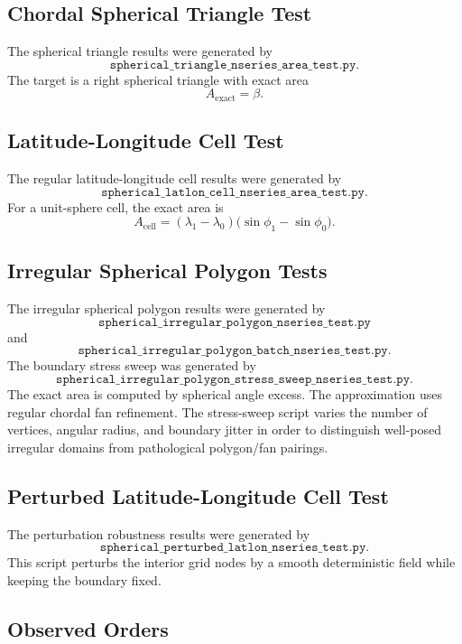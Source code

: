 \documentclass[11pt]{article}
\begin{document}
\subsection{Chordal Spherical Triangle Test}

The spherical triangle results were generated by
\[
  \texttt{spherical\_triangle\_nseries\_area\_test.py}.
\]
The target is a right spherical triangle with exact area
\[
  A_{\mathrm{exact}}=\beta.
\]

\subsection{Latitude-Longitude Cell Test}

The regular latitude-longitude cell results were generated by
\[
  \texttt{spherical\_latlon\_cell\_nseries\_area\_test.py}.
\]
For a unit-sphere cell, the exact area is
\[
  A_{\mathrm{cell}}
  =
  (\lambda_1-\lambda_0)
  \bigl(\sin\phi_1-\sin\phi_0\bigr).
\]

\subsection{Irregular Spherical Polygon Tests}

The irregular spherical polygon results were generated by
\[
  \texttt{spherical\_irregular\_polygon\_nseries\_test.py}
\]
and
\[
  \texttt{spherical\_irregular\_polygon\_batch\_nseries\_test.py}.
\]
The boundary stress sweep was generated by
\[
  \texttt{spherical\_irregular\_polygon\_stress\_sweep\_nseries\_test.py}.
\]
The exact area is computed by spherical angle excess.  The approximation uses regular chordal fan refinement.  The stress-sweep script varies the number of vertices, angular radius, and boundary jitter in order to distinguish well-posed irregular domains from pathological polygon/fan pairings.

\subsection{Perturbed Latitude-Longitude Cell Test}

The perturbation robustness results were generated by
\[
  \texttt{spherical\_perturbed\_latlon\_nseries\_test.py}.
\]
This script perturbs the interior grid nodes by a smooth deterministic field while keeping the boundary fixed.

\subsection{Observed Orders}
\end{document}
